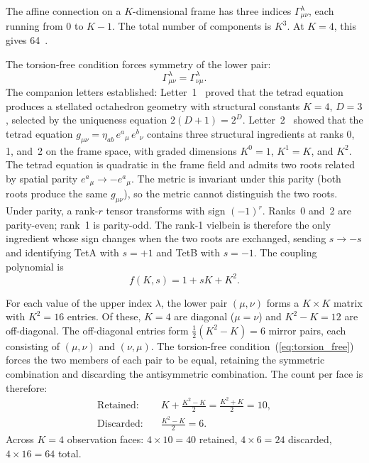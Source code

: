 \documentclass[twocolumn]{iopjournal}
\begin{document}
The affine connection on a $K$-dimensional frame has three
indices $\Gamma^\lambda_{\mu\nu}$, each running from 0 to
$K - 1$.  The total number of components is $K^3$.  At
$K = 4$, this gives 64~\cite{Nelson2026b,Hehl1976}.

The torsion-free condition forces symmetry of the lower pair:
\begin{equation}
  \Gamma^\lambda_{\mu\nu} = \Gamma^\lambda_{\nu\mu}.
  \label{eq:torsion_free}
\end{equation}
The companion letters established: Letter~1~\cite{Nelson2026a}
proved that the tetrad equation produces a stellated
octahedron geometry with structural constants $K = 4$,
$D = 3$, selected by the uniqueness equation
$2(D{+}1) = 2^D$.  Letter~2~\cite{Nelson2026b} showed that
the tetrad equation
$g_{\mu\nu} = \eta_{ab}\,e^a{}_\mu\,e^b{}_\nu$ contains
three structural ingredients at ranks 0, 1, and~2 on the
frame space, with graded dimensions $K^0 = 1$, $K^1 = K$,
and $K^2$.  The tetrad equation is quadratic in the frame
field and admits two roots related by spatial parity
$e^a{}_\mu \to -e^a{}_\mu$.  The metric is invariant under
this parity (both roots produce the same $g_{\mu\nu}$), so
the metric cannot distinguish the two roots.  Under parity,
a rank-$r$ tensor transforms with sign $(-1)^r$.  Ranks~0
and~2 are parity-even; rank~1 is parity-odd.  The rank-1
vielbein is therefore the only ingredient whose sign changes
when the two roots are exchanged, sending $s \to -s$ and
identifying TetA with $s = +1$ and TetB with $s = -1$.  The
coupling polynomial is
\begin{equation}
  f(K,s) = 1 + sK + K^2.
  \label{eq:poly}
\end{equation}

For each value of the upper index $\lambda$, the lower pair
$(\mu, \nu)$ forms a $K \times K$ matrix with $K^2 = 16$
entries.  Of these, $K = 4$ are diagonal ($\mu = \nu$) and
$K^2 - K = 12$ are off-diagonal.  The off-diagonal entries
form $\tfrac{1}{2}(K^2 - K) = 6$ mirror pairs, each
consisting of $(\mu, \nu)$ and $(\nu, \mu)$.  The
torsion-free condition~(\ref{eq:torsion_free}) forces the two
members of each pair to be equal, retaining the symmetric
combination and discarding the antisymmetric combination.  The
count per face is therefore:
\begin{align}
  \text{Retained:} \quad
    & K + \frac{K^2 - K}{2} = \frac{K^2 + K}{2} = 10,
    \label{eq:kept} \\[4pt]
  \text{Discarded:} \quad
    & \frac{K^2 - K}{2} = 6.
    \label{eq:disc}
\end{align}
Across $K = 4$ observation faces: $4 \times 10 = 40$ retained,
$4 \times 6 = 24$ discarded, $4 \times 16 = 64$ total.
\end{document}
